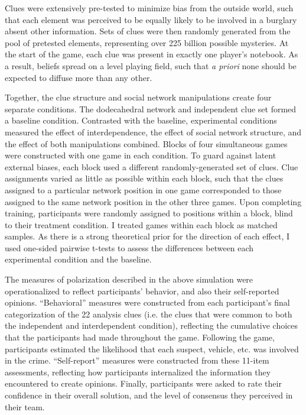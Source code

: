 \documentclass[9pt,twocolumn,twoside,lineno]{pnas-new}
\begin{document}
{Clues were extensively pre-tested to minimize bias from the outside world, such that each element was perceived to be equally likely to be involved in a burglary absent other information. Sets of clues were then randomly generated from the pool of pretested elements, representing over 225 billion possible mysteries. At the start of the game, each clue was present in exactly one player’s notebook. As a result, beliefs spread on a level playing field, such that \textit{a priori} none should be expected to diffuse more than any other.  

Together, the clue structure and social network manipulations create four separate conditions. The dodecahedral network and independent clue set formed a baseline condition. Contrasted with the baseline, experimental conditions measured the effect of interdependence, the effect of social network structure, and the effect of both manipulations combined. Blocks of four simultaneous games were constructed with one game in each condition. To guard against latent external biases, each block used a different randomly-generated set of clues. Clue assignments varied as little as possible within each block, such that the clues assigned to a particular network position in one game corresponded to those assigned to the same network position in the other three games. Upon completing training, participants were randomly assigned to positions within a block, blind to their treatment condition. I treated games within each block as matched samples. As there is a strong theoretical prior for the direction of each effect, I used one-sided pairwise t-tests to assess the differences between each experimental condition and the baseline. 

The measures of polarization described in the above simulation were operationalized to reflect participants’ behavior, and also their self-reported opinions.  ``Behavioral'' measures were constructed from each participant’s final categorization of the 22 analysis clues (i.e. the clues that were common to both the independent and interdependent condition), reflecting the cumulative choices that the participants had made throughout the game. Following the game, participants estimated the likelihood that each suspect, vehicle, etc. was involved in the crime. “Self-report” measures were constructed from these 11-item assessments, reflecting how participants internalized the information they encountered to create opinions. Finally, participants were asked to rate their confidence in their overall solution, and the level of consensus they perceived in their team. 

}
\end{document}
